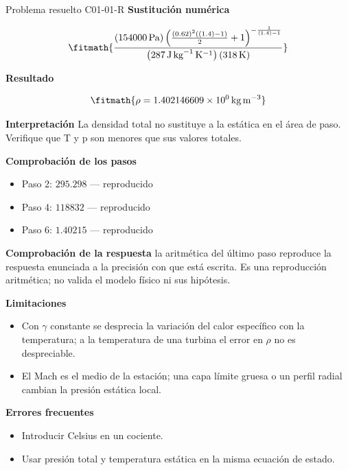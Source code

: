 \documentclass[10pt,openany]{book}
\begin{document}
\begin{studiumworked}{Problema resuelto C01-01-R}
\noindent\textbf{Sustitución numérica}

\[
\fitmath{\frac{\left(154000\,\mathrm{Pa}\right) \left(\frac{\left(0.62\right)^{2} \left(\left(1.4\right) - 1\right)}{2} + 1\right)^{- \frac{1}{\left(1.4\right) - 1}}}{\left(287\,\mathrm{J}\,\mathrm{kg}^{-1}\,\mathrm{K}^{-1}\right) \left(318\,\mathrm{K}\right)}}
\]

\noindent\textbf{Resultado}

\[
\fitmath{\rho=1.402146609\times10^{0}\,\mathrm{kg}\,\mathrm{m}^{-3}}
\]

\noindent\textbf{Interpretación}
La densidad total no sustituye a la estática en el área de paso. Verifique que T y p son menores que sus valores totales.

\noindent\textbf{Comprobación de los pasos}
\begin{itemize}
\item Paso 2: $295.298$ — reproducido
\item Paso 4: $118832$ — reproducido
\item Paso 6: $1.40215$ — reproducido
\end{itemize}

\noindent\textbf{Comprobación de la respuesta} la aritmética del último paso reproduce la respuesta enunciada a la precisión con que está escrita. Es una reproducción aritmética; no valida el modelo físico ni sus hipótesis.

\noindent\textbf{Limitaciones}
\begin{itemize}
\item Con $\gamma$ constante se desprecia la variación del calor específico con la temperatura; a la temperatura de una turbina el error en $\rho$ no es despreciable.
\item El Mach es el medio de la estación; una capa límite gruesa o un perfil radial cambian la presión estática local.
\end{itemize}

\noindent\textbf{Errores frecuentes}
\begin{itemize}
\item Introducir Celsius en un cociente.
\item Usar presión total y temperatura estática en la misma ecuación de estado.
\end{itemize}
\end{studiumworked}
\end{document}

